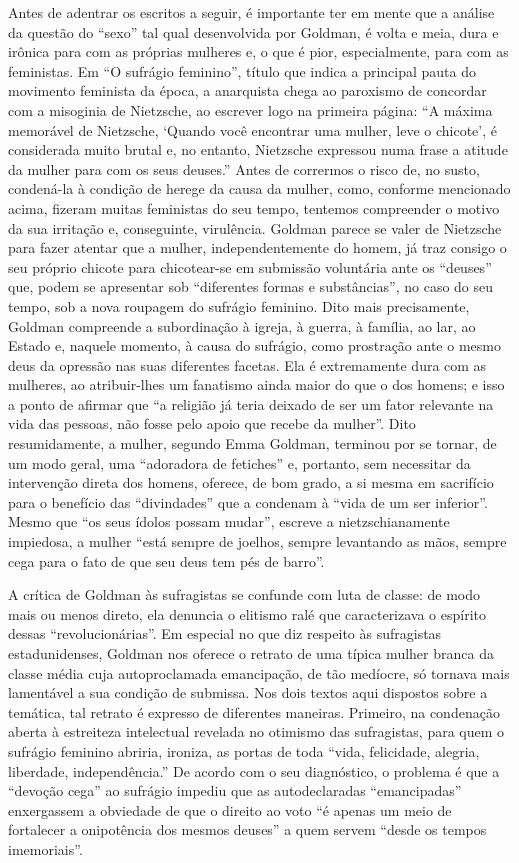 Antes de adentrar os escritos a seguir, é importante ter em mente que a
análise da questão do ``sexo'' tal qual desenvolvida por Goldman, é
volta e meia, dura e irônica para com as próprias mulheres e, o que é
pior, especialmente, para com as feministas. Em ``O sufrágio feminino'',
título que indica a principal pauta do movimento feminista da época, a
anarquista chega ao paroxismo de concordar com a misoginia de Nietzsche,
ao escrever logo na primeira página: ``A máxima memorável de Nietzsche,
`Quando você encontrar uma mulher, leve o chicote', é considerada muito
brutal e, no entanto, Nietzsche expressou numa frase a atitude da mulher
para com os seus deuses.'' Antes de corrermos o risco de, no susto,
condená-la à condição de herege da causa da mulher, como, conforme
mencionado acima, fizeram muitas feministas do seu tempo, tentemos
compreender o motivo da sua irritação e, conseguinte, virulência.
Goldman parece se valer de Nietzsche para fazer atentar que a mulher,
independentemente do homem, já traz consigo o seu próprio chicote para
chicotear-se em submissão voluntária ante os ``deuses'' que, podem se
apresentar sob ``diferentes formas e substâncias'', no caso do seu
tempo, sob a nova roupagem do sufrágio feminino. Dito mais precisamente,
Goldman compreende a subordinação à igreja, à guerra, à família, ao lar,
ao Estado e, naquele momento, à causa do sufrágio, como prostração ante
o mesmo deus da opressão nas suas diferentes facetas. Ela é extremamente
dura com as mulheres, ao atribuir-lhes um fanatismo ainda maior do que o
dos homens; e isso a ponto de afirmar que ``a religião já teria deixado
de ser um fator relevante na vida das pessoas, não fosse pelo apoio que
recebe da mulher''. Dito resumidamente, a mulher, segundo Emma Goldman,
terminou por se tornar, de um modo geral, uma ``adoradora de fetiches''
e, portanto, sem necessitar da intervenção direta dos homens, oferece,
de bom grado, a si mesma em sacrifício para o benefício das
``divindades'' que a condenam à ``vida de um ser inferior''. Mesmo que
``os seus ídolos possam mudar'', escreve a nietzschianamente impiedosa,
a mulher ``está sempre de joelhos, sempre levantando as mãos, sempre
cega para o fato de que seu deus tem pés de barro''.

A crítica de Goldman às sufragistas se confunde com luta de classe: de
modo mais ou menos direto, ela denuncia o elitismo ralé que
caracterizava o espírito dessas ``revolucionárias''. Em especial no que
diz respeito às sufragistas estadunidenses, Goldman nos oferece o
retrato de uma típica mulher branca da classe média cuja autoproclamada
emancipação, de tão medíocre, só tornava mais lamentável a sua condição
de submissa. Nos dois textos aqui dispostos sobre a temática, tal
retrato é expresso de diferentes maneiras. Primeiro, na condenação
aberta à estreiteza intelectual revelada no otimismo das sufragistas,
para quem o sufrágio feminino abriria, ironiza, as portas de toda
``vida, felicidade, alegria, liberdade, independência.'' De acordo com o
seu diagnóstico, o problema é que a ``devoção cega'' ao sufrágio impediu
que as autodeclaradas ``emancipadas'' enxergassem a obviedade de que o
direito ao voto ``é apenas um meio de fortalecer a onipotência dos
mesmos deuses'' a quem servem ``desde os tempos imemoriais''.

